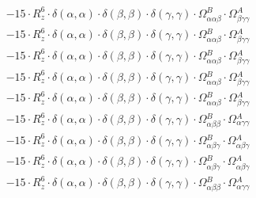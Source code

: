 \documentclass{article}
\begin{document}
\begin{subequations}
\begin{gather}
\begin{array}{c}
 \\[0.2em] 		 - 15 \cdot R_{z}^{6} \cdot \delta{}\left(\alpha{}, \alpha{}\right) \cdot \delta{}\left(\beta{}, \beta{}\right) \cdot \delta{}\left(\gamma{}, \gamma{}\right) \cdot \Omega{}^{B}_{\alpha{}\alpha{}\beta{}} \cdot \Omega{}^{A}_{\beta{}\gamma{}\gamma{}} 
 \\[0.2em] 		 - 15 \cdot R_{z}^{6} \cdot \delta{}\left(\alpha{}, \alpha{}\right) \cdot \delta{}\left(\beta{}, \beta{}\right) \cdot \delta{}\left(\gamma{}, \gamma{}\right) \cdot \Omega{}^{B}_{\alpha{}\alpha{}\beta{}} \cdot \Omega{}^{A}_{\beta{}\gamma{}\gamma{}} 
 \\[0.2em] 		 - 15 \cdot R_{z}^{6} \cdot \delta{}\left(\alpha{}, \alpha{}\right) \cdot \delta{}\left(\beta{}, \beta{}\right) \cdot \delta{}\left(\gamma{}, \gamma{}\right) \cdot \Omega{}^{B}_{\alpha{}\alpha{}\beta{}} \cdot \Omega{}^{A}_{\beta{}\gamma{}\gamma{}} 
 \\[0.2em] 		 - 15 \cdot R_{z}^{6} \cdot \delta{}\left(\alpha{}, \alpha{}\right) \cdot \delta{}\left(\beta{}, \beta{}\right) \cdot \delta{}\left(\gamma{}, \gamma{}\right) \cdot \Omega{}^{B}_{\alpha{}\alpha{}\beta{}} \cdot \Omega{}^{A}_{\beta{}\gamma{}\gamma{}} 
 \\[0.2em] 		 - 15 \cdot R_{z}^{6} \cdot \delta{}\left(\alpha{}, \alpha{}\right) \cdot \delta{}\left(\beta{}, \beta{}\right) \cdot \delta{}\left(\gamma{}, \gamma{}\right) \cdot \Omega{}^{B}_{\alpha{}\alpha{}\beta{}} \cdot \Omega{}^{A}_{\beta{}\gamma{}\gamma{}} 
 \\[0.2em] 		 - 15 \cdot R_{z}^{6} \cdot \delta{}\left(\alpha{}, \alpha{}\right) \cdot \delta{}\left(\beta{}, \beta{}\right) \cdot \delta{}\left(\gamma{}, \gamma{}\right) \cdot \Omega{}^{B}_{\alpha{}\beta{}\beta{}} \cdot \Omega{}^{A}_{\alpha{}\gamma{}\gamma{}} 
 \\[0.2em] 		 - 15 \cdot R_{z}^{6} \cdot \delta{}\left(\alpha{}, \alpha{}\right) \cdot \delta{}\left(\beta{}, \beta{}\right) \cdot \delta{}\left(\gamma{}, \gamma{}\right) \cdot \Omega{}^{B}_{\alpha{}\beta{}\gamma{}} \cdot \Omega{}^{A}_{\alpha{}\beta{}\gamma{}} 
 \\[0.2em] 		 - 15 \cdot R_{z}^{6} \cdot \delta{}\left(\alpha{}, \alpha{}\right) \cdot \delta{}\left(\beta{}, \beta{}\right) \cdot \delta{}\left(\gamma{}, \gamma{}\right) \cdot \Omega{}^{B}_{\alpha{}\beta{}\gamma{}} \cdot \Omega{}^{A}_{\alpha{}\beta{}\gamma{}} 
 \\[0.2em] 		 - 15 \cdot R_{z}^{6} \cdot \delta{}\left(\alpha{}, \alpha{}\right) \cdot \delta{}\left(\beta{}, \beta{}\right) \cdot \delta{}\left(\gamma{}, \gamma{}\right) \cdot \Omega{}^{B}_{\alpha{}\beta{}\beta{}} \cdot \Omega{}^{A}_{\alpha{}\gamma{}\gamma{}} 

\end{array}
\end{gather}
\end{subequations}
\end{document}
